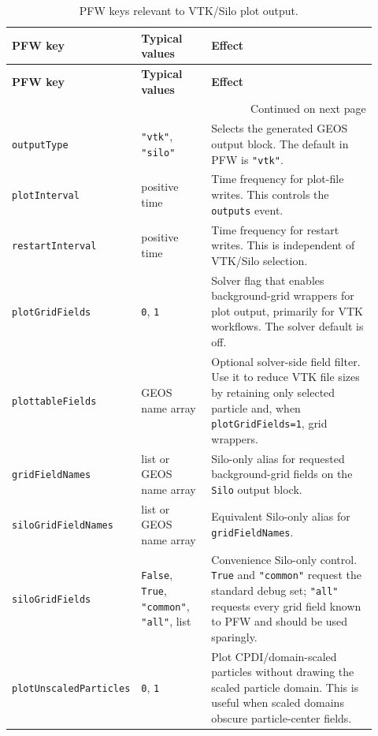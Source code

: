 {\small
\begin{longtable}{@{}p{0.22\linewidth}p{0.20\linewidth}p{0.50\linewidth}@{}}
\caption{PFW keys relevant to VTK/Silo plot output.}\label{tab:pfw-output-controls}\\
\toprule
\textbf{PFW key} & \textbf{Typical values} & \textbf{Effect}\\
\midrule
\endfirsthead
\toprule
\textbf{PFW key} & \textbf{Typical values} & \textbf{Effect}\\
\midrule
\endhead
\midrule
\multicolumn{3}{r}{Continued on next page}\\
\endfoot
\bottomrule
\endlastfoot
\texttt{outputType} & \texttt{"vtk"}, \texttt{"silo"} & Selects the generated GEOS output block.  The default in PFW is \texttt{"vtk"}.\\
\texttt{plotInterval} & positive time & Time frequency for plot-file writes.  This controls the \texttt{outputs} event.\\
\texttt{restartInterval} & positive time & Time frequency for restart writes.  This is independent of VTK/Silo selection.\\
\texttt{plotGridFields} & \texttt{0}, \texttt{1} & Solver flag that enables background-grid wrappers for plot output, primarily for VTK workflows.  The solver default is off.\\
\texttt{plottableFields} & GEOS name array & Optional solver-side field filter.  Use it to reduce VTK file sizes by retaining only selected particle and, when \texttt{plotGridFields=1}, grid wrappers.\\
\texttt{gridFieldNames} & list or GEOS name array & Silo-only alias for requested background-grid fields on the \texttt{Silo} output block.\\
\texttt{siloGridFieldNames} & list or GEOS name array & Equivalent Silo-only alias for \texttt{gridFieldNames}.\\
\texttt{siloGridFields} & \texttt{False}, \texttt{True}, \texttt{"common"}, \texttt{"all"}, list & Convenience Silo-only control.  \texttt{True} and \texttt{"common"} request the standard debug set; \texttt{"all"} requests every grid field known to PFW and should be used sparingly.\\
\texttt{plotUnscaledParticles} & \texttt{0}, \texttt{1} & Plot CPDI/domain-scaled particles without drawing the scaled particle domain.  This is useful when scaled domains obscure particle-center fields.\\
\end{longtable}
}

